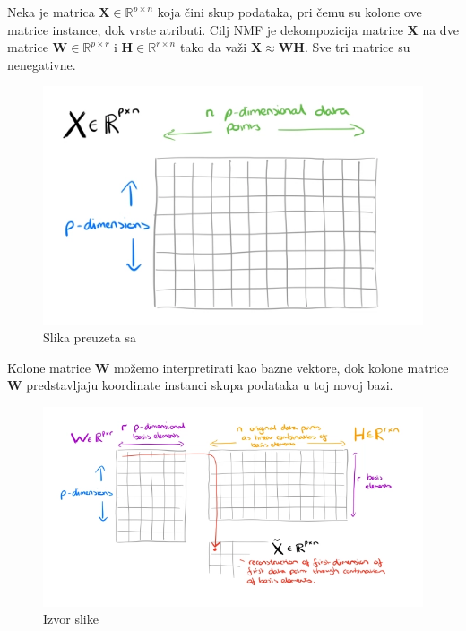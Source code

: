 \documentclass[a4paper]{article}
\begin{document}
Neka je matrica $\mathbf{X} \in \mathbb{R}^{p\times n}$ koja čini skup podataka, pri čemu su kolone ove matrice instance, dok vrste atributi. Cilj NMF je dekompozicija matrice $\mathbf{X}$ na dve matrice $\mathbf{W} \in  \mathbb{R}^{p\times r} $ i $\mathbf{H} \in  \mathbb{R}^{r\times n}$ tako da važi $\mathbf{X} \approx \mathbf{W}\mathbf{H}$. Sve tri matrice su nenegativne.

\begin{figure}[H]
\centering
\caption{Slika preuzeta sa \cite{lamacraftausten}}
\includegraphics[scale=0.6]{x_nmf}
\end{figure}

Kolone matrice $\mathbf{W}$ možemo interpretirati kao bazne vektore, dok kolone matrice $\mathbf{W}$ predstavljaju koordinate instanci skupa podataka u toj novoj bazi.

\begin{figure}[H]
\centering

\includegraphics[scale=0.6]{wh_nmf}
\caption{Izvor slike \cite{lamacraftausten}}
\end{figure}
\end{document}

